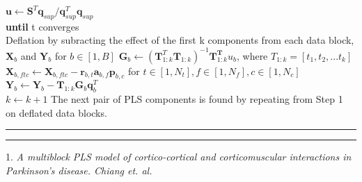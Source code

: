 \documentclass[11pt]{article}
\newcommand{\question}[2] {\vspace{.25in} \hrule\vspace{0.5em}
\noindent{\bf #1: #2} \vspace{0.5em}
\hrule \vspace{.10in}}
\begin{document}
\begin{algorithm}
\begin{algorithmic}[1]
\\$\textbf{u} \leftarrow \textbf{S}^T \textbf{q}_{sup} / \textbf{q}_{sup}^T \textbf{q}_{sup}$
\\\textbf{until} t converges
\\Deflation by subracting the effect of the first k components from each data block, $\textbf{X}_b$ and $\textbf{Y}_b$ for $b \in [1,B]$
\State$\textbf{G}_b \leftarrow (\textbf{T}_{1:k}^T \textbf{T}_{1:k})^{-1}\textbf{T}_{1:k}^\textbf{T} u_b$, where $T_{1:k} = [t_1, t_2, ... t_k]$
\State$\textbf{X}_{b,ftc} \leftarrow \textbf{X}_{b,ftc} - \textbf{r}_{b,t}\textbf{a}_{b,f}\textbf{p}_{b,c}$ for $t \in [1,N_t], f \in [1,N_f], c \in [1,N_c]$
\State$\textbf{Y}_b \leftarrow \textbf{Y}_b - \textbf{T}_{1:k}\textbf{G}_b \textbf{q}_b^T$
\EndFor
\\$k \leftarrow k + 1$ The next pair of PLS components is found by repeating from Step 1 on deflated data blocks.
\end{algorithmic}
\end{algorithm}
\question{A}{References}
1. \textsl{A multiblock PLS model of cortico-cortical and corticomuscular interactions in Parkinson's disease. Chiang et. al.}
\end{document}
